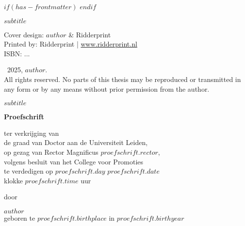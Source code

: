 $if(has-frontmatter)$
\frontmatter
$endif$


\begin{titlepage}
  \hspace{0pt}
  \vfill
  \begin{center}
     \par %
    \smallskip
    \textsf{\Large $subtitle$} \par
    \vfill
  \end{center}
\end{titlepage}


\clearpage
\thispagestyle{empty}
\vspace*{\fill} %

\begingroup
  \setlength{\parskip}{\baselineskip}
  \begin{flushleft}
    Cover design: $author$ \& Ridderprint \\
    Printed by: Ridderprint | \href{www.ridderprint.nl}{www.ridderprint.nl} \\
    ISBN: ...\par

    \textcopyright \ 2025, $author$. \\
    All rights reserved. No parts of this thesis may be reproduced or transmitted in any form or by any means without prior permission from the author.
  \end{flushleft}
\endgroup


\clearpage
\thispagestyle{empty}

\begin{center}
   \par %
  \smallskip
  \textsf{\Large $subtitle$} \par
  \vfill
  \textbf{\large Proefschrift} \par
  \vspace{2\baselineskip}
  \large{
    ter verkrijging van \\
    de graad van Doctor aan de Universiteit Leiden, \\
    op gezag van Rector Magnificus $proefschrift.rector$, \\
    volgens besluit van het College voor Promoties \\
    te verdedigen op $proefschrift.day$ $proefschrift.date$ \\
    klokke $proefschrift.time$ uur
  } \par
  \vspace{2\baselineskip}
  \large{door} \par
  \vspace{2\baselineskip}
  \large{$author$} \\
  \normalsize{geboren te $proefschrift.birthplace$ in $proefschrift.birthyear$} \par
\end{center}


